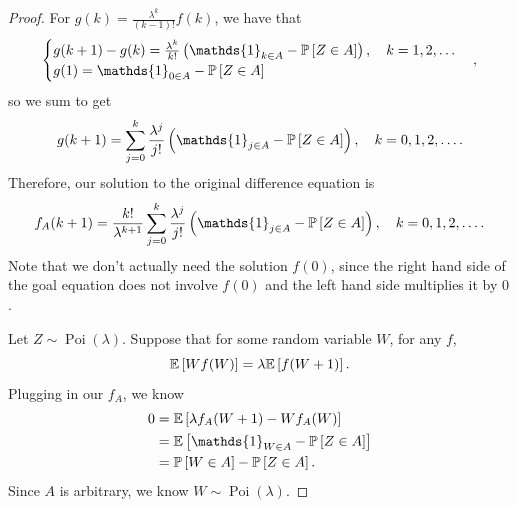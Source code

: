 \begin{proof}
	For $g(k) = \frac{\lambda^k}{(k-1)!} f(k)$, we have that \[
		\begin{cases}
			g(k+1) - g(k) = \frac{\lambda^k}{k!} \left( \mathds{1}_{ k \in A} - \P\left[Z \in A\right]  \right), \quad k= 1,2,\ldots \\
			g(1) = \mathds{1}_{0 \in A} - \P\left[Z \in A\right] 
		\end{cases}
	,\] 
	so we sum to get \[
		g(k+1) = \sum\limits_{j=0}^{k} \frac{\lambda^j}{j!} \left( \mathds{1}_{j \in A} - \P\left[Z \in A\right]  \right), \quad k = 0,1,2,\ldots
	.\] Therefore, our solution to the original difference equation is \[
		f_A(k+1) = \frac{k!}{\lambda^{k+1}} \sum\limits_{j=0}^{k} \frac{\lambda^j}{j!} \left( \mathds{1}_{j \in A} - \P\left[Z \in A\right]  \right), \quad k = 0, 1,2,\ldots
	.\] 
	Note that we don't actually need the solution $f(0)$, since the right hand side of the goal equation does not involve $f\left(0 \right)$ and the left hand side multiplies it by $0$.

	Let $Z \sim \operatorname{Poi}(\lambda)$. Suppose that for some random variable $W$, for any $f$, \[
		\mathbb{E}\left[W f(W)\right] = \lambda \mathbb{E}\left[f(W+1)\right] 
	.\] 
	Plugging in our $f_A$, we know
	\begin{align*}
		0
		&= \E\left[\lambda f_A(W+1) - W f_A(W)\right] \\
		&= \E\left[\mathds{1}_{W \in A} - \P\left[Z \in A\right] \right] \\
		&= \P\left[W \in A\right] - \P\left[Z \in A\right]
	.\end{align*}
	Since $A$ is arbitrary, we know $W \sim \operatorname{Poi}(\lambda)$.
\end{proof}


